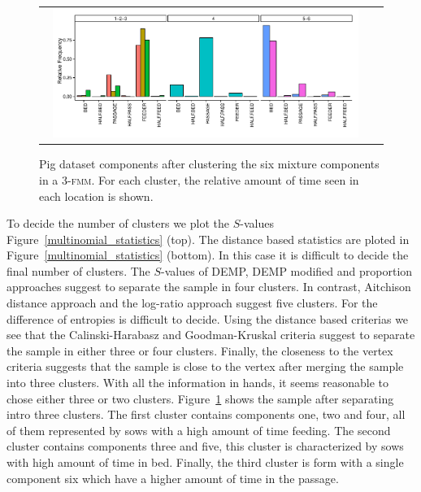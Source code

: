 \documentclass[submit]{smj}
\theoremstyle{definition}
\newcommand{\fmm}{\textsc{fmm}\xspace}
\begin{document}
\begin{figure}[htpb]
\begin{center}
\begin{tabular}{cc}
  \includegraphics[width=0.95\textwidth]{figures/multinomial_clust3_all.pdf} \\
 \end{tabular}
 \caption{Pig dataset components after clustering the six mixture components in a 3-\fmm. For each cluster, the relative amount of time seen in each location is shown.}\label{multinomial_clust3}
\end{center}
\end{figure}

To decide the number of clusters we plot the $S$-values Figure~\ref{multinomial_statistics} (top). The distance based statistics are ploted in Figure~\ref{multinomial_statistics} (bottom). In this case it is difficult to decide the final number of clusters. The $S$-values of DEMP, DEMP modified and proportion approaches suggest to separate the sample in four clusters. In contrast, Aitchison distance approach and the log-ratio approach suggest five clusters. For the difference of entropies is difficult to decide. Using the distance based criterias we see that the Calinski-Harabasz and Goodman-Kruskal criteria suggest to separate the sample in either three or four clusters. Finally, the closeness to the vertex criteria suggests that the sample is close to the vertex after merging the sample into three clusters. With all the information in hands, it seems reasonable to chose either three or two clusters.  Figure~\ref{multinomial_clust3}  shows the sample after separating intro three clusters. The first cluster contains components one, two and four, all of them represented by sows with a high amount of time feeding. The second cluster contains components three and five, this cluster is characterized by sows with high amount of time in bed. Finally, the third cluster is form with a single component six which have a higher amount of time in the passage.
\end{document}
